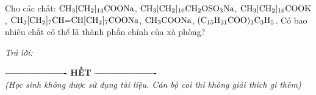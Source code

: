 \documentclass[11pt,a4paper]{article}
\begin{document}
\begin{ex}
Cho các chất: $\ce{CH3[CH2]14COONa}$, $\ce{CH3[CH2]10CH2OSO3Na}$, $\ce{CH3[CH2]16COOK}$, $\ce{CH3[CH2]7CH=CH[CH2]7COONa}$, $\ce{CH3COONa}$, $(\ce{C15H31COO})_3\ce{C3H5}$. Có bao nhiêu chất có thể là thành phần chính của xà phòng?

\textit{Trả lời:} \dotfill
\end{ex}
\vspace{10pt}
\begin{center}
\textbf{------------------- HẾT -------------------}\\
\textit{\small (Học sinh không được sử dụng tài liệu. Cán bộ coi thi không giải thích gì thêm)}
\end{center}
\end{document}
